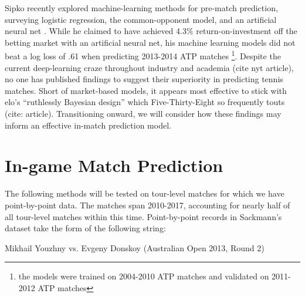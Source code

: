 \documentclass[chapterprefix=false]{report}
\begin{document}

Sipko recently explored machine-learning methods for pre-match prediction, surveying logistic regression, the common-opponent model, and an artificial neural net \cite{Sipko2015}. While he claimed to have achieved 4.3$\%$ return-on-investment off the betting market with an artificial neural net, his machine learning models did not beat a log loss of .61 when predicting 2013-2014 ATP matches \footnote{the models were trained on 2004-2010 ATP matches and validated on 2011-2012 ATP matches}. Despite the current deep-learning craze throughout industry and academia (cite nyt article), no one has published findings to suggest their superiority in predicting tennis matches. Short of market-based models, it appears most effective to stick with elo's ``ruthlessly Bayesian design'' which Five-Thirty-Eight so frequently touts (cite: article). Transitioning onward, we will consider how these findings may inform an effective in-match prediction model.







\chapter{In-game Match Prediction}


The following methods will be tested on tour-level matches for which we have point-by-point data. The matches span 2010-2017, accounting for nearly half of all tour-level matches within this time. Point-by-point records in Sackmann's dataset take the form of the following string:

Mikhail Youzhny vs. Evgeny Donskoy (Australian Open 2013, Round 2)
\end{document}
